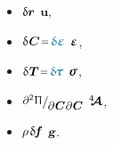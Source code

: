 \vspace{-0.4em}\noindent
{}
\begin{itemize}
\item
   ${\updelta\hspace{-0.1ex}\bm{r}}$
   \hbox{\hspace{.25ex}\hspace{.25ex}}
   $\bm{u}$\hbox{\hspace{.1ex},}
\item
   ${\variation{\hspace{.12ex}\bm{C}} \narroweq \hspace{.1ex} \infinimentpetitedeformationvariation}$
   \hbox{\hspace{.25ex}\hspace{.25ex}}
   $\infinitesimaldeformation$,
\item
   ${\variation{\hspace{.1ex}\firstpiolakirchhoffstress} \narroweq \hspace{.1ex} \variedcauchystress}$
   \hbox{\hspace{.25ex}\hspace{.25ex}}
   $\linearstress$,
\item ${%
   \scalebox{.95}{$%
      \raisemath{.15em}{ \scalebox{.92}{$ \partial^2 \hspace{.1ex} \potentialenergydensity $} } $}
   /
   \hspace{-0.1ex}
   \raisemath{-0.3em}{\scalebox{.92}{$
      \partial \hspace{.1ex} \bm{C}
      \hspace{.1ex}
      \partial \hspace{.1ex} \bm{C}
   $}} }$
   \hbox{\hspace{.25ex}\hspace{.25ex}}
   $\hspace{.08ex}{^4\hspace{-0.7ex}\bm{\mathcal{A}}}\hspace{.08ex}$\hbox{\hspace{.2ex},}
\item
   ${ \hspace{-0.1ex} \massdensity \hspace{.25ex}
   \variation{\hspace{-0.2ex}\massloadvector} }$
   \hbox{\hspace{.25ex}\hspace{.25ex}}
   ${ \hspace{-0.1ex} \textbf{\textsl{g}} \hspace{-0.1ex} }$.
\end{itemize}

